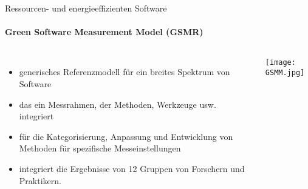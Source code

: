 \begin{frame}{Ressourcen- und energieeffizienten Software \cite{GSMR_info_2024}}
\framesubtitle{Green Software Measurement Model (GSMR)}
\begin{columns}
\column{7cm}
\begin{itemize}
	\item   generisches Referenzmodell für ein breites Spektrum von Software 
	\item  das ein Messrahmen, der Methoden, Werkzeuge usw. integriert
	\item für die Kategorisierung, Anpassung und Entwicklung von Methoden für spezifische Messeinstellungen
	\item  integriert die Ergebnisse von 12 Gruppen von Forschern und Praktikern.
\end{itemize}
\column{7cm}
\texttt{[image: GSMM.jpg]}\label{fig.GSMM}\\ \hspace*{\fill}\infoAbb


\end{columns}
\end{frame}



